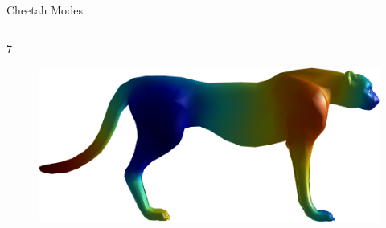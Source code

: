 \documentclass{beamer}
\begin{document}
\begin{frame}{Cheetah Modes}
\begin{columns}
\begin{column}[T]{5cm}
\begin{figure}[t]
\end{figure}
7
\begin{figure}[t]
    \includegraphics[width=\textwidth]{Harmonics/CheetahModes/7.png}
\end{figure}
\end{column}
\end{columns}

\end{frame}
\end{document}
